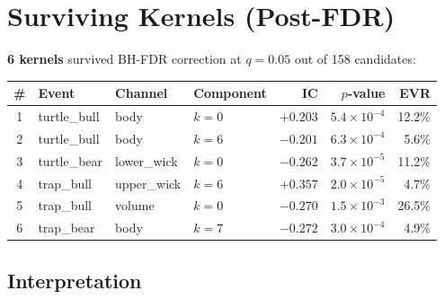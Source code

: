 \documentclass[11pt,a4paper]{article}
\begin{document}
\section{Surviving Kernels (Post-FDR)}

\textbf{6 kernels} survived BH-FDR correction at $q = 0.05$ out of 158 candidates:

\begin{center}
\small
\begin{tabular}{clllrrr}
\hline
\textbf{\#} & \textbf{Event} & \textbf{Channel} & \textbf{Component} & \textbf{IC} & \textbf{$p$-value} & \textbf{EVR} \\
\hline
1 & turtle\_bull  & body        & $k=0$ & $+0.203$ & $5.4 \times 10^{-4}$ & 12.2\% \\
2 & turtle\_bull  & body        & $k=6$ & $-0.201$ & $6.3 \times 10^{-4}$ & 5.6\%  \\
3 & turtle\_bear  & lower\_wick & $k=0$ & $-0.262$ & $3.7 \times 10^{-5}$ & 11.2\% \\
4 & trap\_bull    & upper\_wick & $k=6$ & $+0.357$ & $2.0 \times 10^{-5}$ & 4.7\%  \\
5 & trap\_bull    & volume      & $k=0$ & $-0.270$ & $1.5 \times 10^{-3}$ & 26.5\% \\
6 & trap\_bear    & body        & $k=7$ & $-0.272$ & $3.0 \times 10^{-4}$ & 4.9\%  \\
\hline
\end{tabular}
\end{center}

\subsection*{Interpretation}
\end{document}
